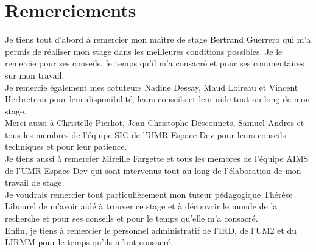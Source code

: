 \chapter*{Remerciements}

Je tiens tout d'abord à remercier mon maître de stage Bertrand Guerrero qui m'a permis de réaliser mon stage dans les meilleures conditions possibles. Je le remercie pour ses conseils, le temps qu'il m'a consacré et pour ses commentaires sur mon travail. \\

Je remercie également mes cotuteurs Nadine Dessay, Maud Loireau et Vincent Herbreteau pour leur disponibilité, leurs conseils et leur aide tout au long de mon stage. \\

Merci aussi à Christelle Pierkot, Jean-Christophe Desconnets, Samuel Andres et tous les membres de l'équipe SIC de l'UMR Espace-Dev pour leurs conseils techniques et pour leur patience. \\

Je tiens aussi à remercier Mireille Fargette et tous les membres de l'équipe AIMS de l'UMR Espace-Dev qui sont intervenus tout au long de l'élaboration de mon travail de stage. \\

Je voudrais remercier tout particulièrement mon tuteur pédagogique Thérèse Libourel de m'avoir aidé à trouver ce stage et à découvrir le monde de la recherche et pour ses conseils et pour le temps qu'elle m'a consacré. \\

Enfin, je tiens à remercier le personnel administratif de l'IRD, de l'UM2 et du LIRMM pour le temps qu'ils m'ont consacré. 

